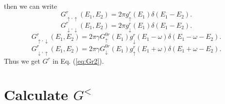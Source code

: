 \documentclass[11pt,a4paper]{article}
\begin{document}
then we can write
\begin{equation}
G_{\uparrow,\uparrow}^{r}(E_{1},E_{2}) = 2\pi g_{\uparrow}^{r}(E_{1}) \delta(E_{1}-E_{2}).
\end{equation}
\begin{equation}
G_{\downarrow,\downarrow}^{r}(E_{1},E_{2}) = 2\pi g_{\downarrow}^{r}(E_{1}) \delta(E_{1}-E_{2}).
\end{equation}
\begin{equation}
G_{\uparrow,\downarrow}^{r}(E_{1},E_{2}) = 2\pi \gamma G_{\uparrow}^{0r}(E_{1}) g_{\downarrow}^{r}(E_{1}-\omega) \delta(E_{1}-\omega-E_{2}).
\end{equation}
\begin{equation}
G_{\downarrow,\uparrow}^{r}(E_{1},E_{2}) = 2\pi\gamma G_{\downarrow}^{0r}(E_{1})g_{\uparrow}^{r}(E_{1}+\omega) \delta(E_{1}+\omega-E_{2}).
\end{equation}
Thus we get $G^{r}$ in Eq. (\ref{eq:Gr2}).
\section{Calculate $G^{<}$}
\end{document}
